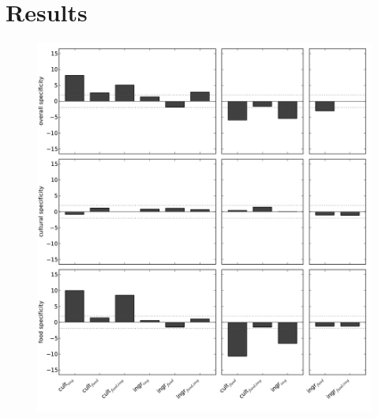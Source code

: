 \documentclass[letterpaper, 11pt, twocolumn]{article}
\begin{document}
\section*{Results}
\begin{figure}
	\includegraphics[scale=0.65]{../figs/specificity.pdf}
\end{figure}



\end{document}
